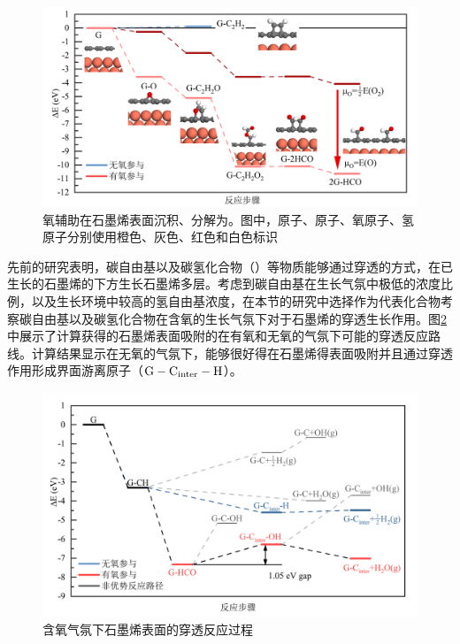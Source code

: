 \begin{figure}[htb]
    \includegraphics{pic/FLG_DFT_C2H2toCHO.png}
    \caption{氧辅助在石墨烯表面沉积、分解为。图中，原子、原子、氧原子、氢原子分别使用橙色、灰色、红色和白色标识}
    \label{fig:FLG_DFT_C2H2toCHO}
\end{figure}

先前的研究表明，碳自由基以及碳氢化合物（）等物质能够通过穿透的方式，在已生长的石墨烯的下方生长石墨烯多层。考虑到碳自由基在生长气氛中极低的浓度比例，以及生长环境中较高的氢自由基浓度，在本节的研究中选择作为代表化合物考察碳自由基以及碳氢化合物在含氧的生长气氛下对于石墨烯的穿透生长作用。图\ref{fig:FLG_DFT_CHpene}中展示了计算获得的石墨烯表面吸附的在有氧和无氧的气氛下可能的穿透反应路线。计算结果显示在无氧的气氛下，能够很好得在石墨烯得表面吸附并且通过穿透作用形成界面游离原子（$\rm G-C_{inter}-H$）。

\begin{figure}[htb]
    \includegraphics{pic/FLG_DFT_CHpene.png}
    \caption{含氧气氛下石墨烯表面的穿透反应过程}
    \label{fig:FLG_DFT_CHpene}
\end{figure}

